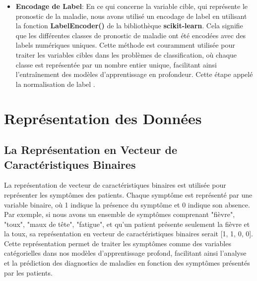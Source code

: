 \begin{enumerate}
\begin{itemize}
        \item \textbf{Encodage de Label}: En ce qui concerne la variable cible, qui représente le pronostic de la maladie, nous avons utilisé un encodage de label en utilisant la fonction \textbf{LabelEncoder()} de la bibliothèque \textbf{scikit-learn}. Cela signifie que les différentes classes de pronostic de maladie ont été encodées avec des labels numériques uniques. Cette méthode est couramment utilisée pour traiter les variables cibles dans les problèmes de classification, où chaque classe est représentée par un nombre entier unique, facilitant ainsi l'entraînement des modèles d'apprentissage en profondeur. Cette étape appelé la normalisation de label .
    \end{itemize}

\end{enumerate}
\section{Représentation des Données}
\subsection{La Représentation en Vecteur de Caractéristiques Binaires}
La représentation de vecteur de caractéristiques binaires est utilisée pour représenter les symptômes des patients. Chaque symptôme est représenté par une variable binaire, où 1 indique la présence du symptôme et 0 indique son absence. Par exemple, si nous avons un ensemble de symptômes comprenant {"fièvre", "toux", "maux de tête", "fatigue"}, et qu'un patient présente seulement la fièvre et la toux, sa représentation en vecteur de caractéristiques binaires serait [1, 1, 0, 0].
Cette représentation permet de traiter les symptômes comme des variables catégorielles dans nos modèles d'apprentissage profond, facilitant ainsi l'analyse et la prédiction des diagnostics de maladies en fonction des symptômes présentés par les patients.
